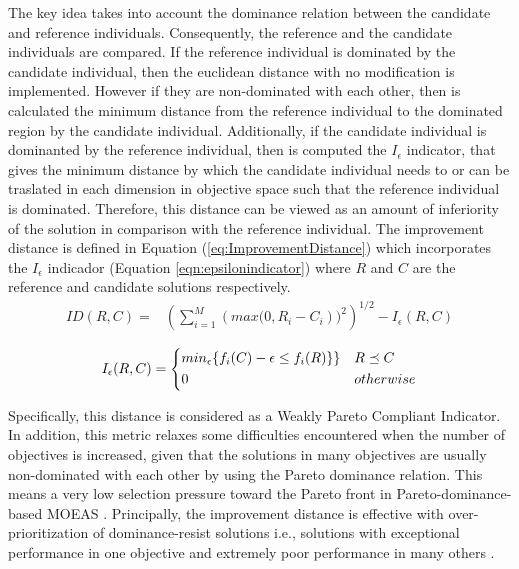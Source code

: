 The key idea takes into account the dominance relation between the candidate and reference individuals. %
%
%
Consequently, the reference and the candidate individuals are compared.
%
If the reference individual is dominated by the candidate individual, then the euclidean distance with no modification is implemented.
%
However if they are non-dominated with each other, then is calculated the minimum distance from the reference individual to the dominated region by the candidate individual. %
%
Additionally, if the candidate individual is dominanted by the reference individual, then is computed the $I_\epsilon$ indicator, that gives the minimum distance by which the candidate individual needs to or can be traslated in each dimension in objective space such that the reference individual is dominated.
%
Therefore, this distance can be viewed as an amount of inferiority of the solution in comparison with the reference individual.	
%
The improvement distance is defined in Equation (\ref{eq:ImprovementDistance}) which incorporates the $I_\epsilon$ indicador (Equation \ref{eqn:epsilonindicator})  where $R$ and $C$ are the reference and candidate solutions respectively. 
\begin{equation} \label{eq:ImprovementDistance}
\begin{split}
 ID(R, C) = &  \left (\sum_{i=1}^M \left (max(0, R_i - C_i \right ))^2  \right)^{1/2} - I_\epsilon(R,C) \\
\end{split}
\end{equation}
\begin{equation}\label{eqn:epsilonindicator}
\begin{split}
I_\epsilon(R,C) = \begin{dcases}
   min_{\epsilon} \{ f_i(C) - \epsilon \leq f_i (R) \} \} & R \preceq C \\
    0 & otherwise
	\end{dcases}
\end{split}
\end{equation}

Specifically, this distance is considered as a Weakly Pareto Compliant Indicator.
%
In addition, this metric relaxes some difficulties encountered when the number of objectives is increased, given that the solutions in many objectives are usually non-dominated with each other by using the Pareto dominance relation.
%
This means a very low selection pressure toward the Pareto front in Pareto-dominance-based MOEAS \cite{Joel:Optimization_Of_Scalarizing_Functions_Through_Evolutionary_MOEAS}.
%
Principally, the improvement distance is effective with over-prioritization  of dominance-resist solutions i.e., solutions with exceptional performance in one objective and extremely poor performance in many others \cite{Joel:Failure_MOEAs}.
%
